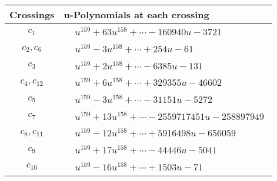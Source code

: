 \documentclass[1p]{elsarticle_modified}
\theoremstyle{definition}
\begin{document}
\begin{tabular}{m{50pt}|m{274pt}}
Crossings & \hspace{64pt}u-Polynomials at each crossing \\
\hline $$\begin{aligned}c_{1}\end{aligned}$$&$\begin{aligned}
&u^{159}+63 u^{158}+\cdots-160940 u-3721
\end{aligned}$\\
\hline $$\begin{aligned}c_{2},c_{6}\end{aligned}$$&$\begin{aligned}
&u^{159}-3 u^{158}+\cdots+254 u-61
\end{aligned}$\\
\hline $$\begin{aligned}c_{3}\end{aligned}$$&$\begin{aligned}
&u^{159}+2 u^{158}+\cdots-6385 u-131
\end{aligned}$\\
\hline $$\begin{aligned}c_{4},c_{12}\end{aligned}$$&$\begin{aligned}
&u^{159}+6 u^{158}+\cdots+329355 u-46602
\end{aligned}$\\
\hline $$\begin{aligned}c_{5}\end{aligned}$$&$\begin{aligned}
&u^{159}-3 u^{158}+\cdots-31151 u-5272
\end{aligned}$\\
\hline $$\begin{aligned}c_{7}\end{aligned}$$&$\begin{aligned}
&u^{159}+13 u^{158}+\cdots-2559717451 u-258897949
\end{aligned}$\\
\hline $$\begin{aligned}c_{8},c_{11}\end{aligned}$$&$\begin{aligned}
&u^{159}-12 u^{158}+\cdots+5916498 u-656059
\end{aligned}$\\
\hline $$\begin{aligned}c_{9}\end{aligned}$$&$\begin{aligned}
&u^{159}+17 u^{158}+\cdots-44446 u-5041
\end{aligned}$\\
\hline $$\begin{aligned}c_{10}\end{aligned}$$&$\begin{aligned}
&u^{159}-16 u^{158}+\cdots+1503 u-71
\end{aligned}$\\
\hline
\end{tabular}\\~\\
\end{document}
